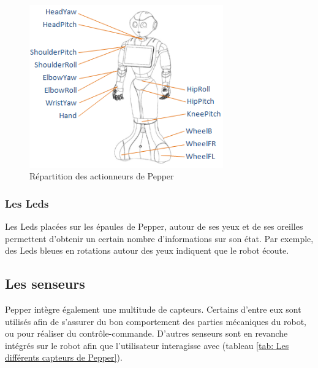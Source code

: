 \begin{figure}[h]
	\centering\includegraphics[height=7cm]{images/pepper_motors.png}
	\caption{Répartition des actionneurs de Pepper}
	\label{fig:Répartition des actionneurs de Pepper}
\end{figure}

\subsubsection{Les Leds}
\label{Introduction:Présentation du produit:Les actionneurs: Les leds}
Les Leds placées sur les épaules de Pepper, autour de ses yeux et de ses oreilles permettent d'obtenir un certain nombre d'informations sur son état. Par exemple, des Leds bleues en rotations autour des yeux indiquent que le robot écoute.  

\subsection{Les senseurs}
\label{Introduction:Présentation du produit:Les senseurs}
Pepper intègre également une multitude de capteurs. Certains d'entre eux sont utilisés afin de s'assurer du bon comportement des parties mécaniques du robot, ou pour réaliser du contrôle-commande. D'autres senseurs sont en revanche intégrés sur le robot afin que l'utilisateur interagisse avec (tableau \ref{tab: Les différents capteurs de Pepper}).

